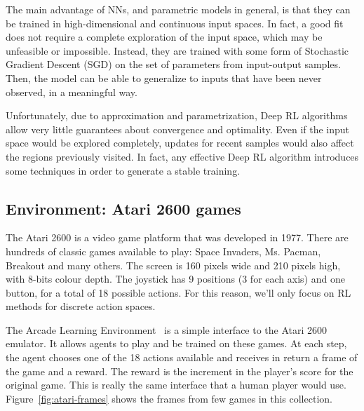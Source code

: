 The main advantage of NNs, and parametric models in general, is that they can
be trained in high-dimensional and continuous input spaces. In fact, a good
fit does not require a complete exploration of the input space, which may be
unfeasible or impossible. Instead, they are trained with some form of
Stochastic Gradient Descent (SGD) on the set of parameters from input-output
samples. Then, the model can be able to generalize to inputs that have been
never observed, in a meaningful way.

Unfortunately, due to approximation and parametrization, Deep RL algorithms
allow very little guarantees about convergence and optimality. Even if the
input space would be explored completely, updates for recent samples would
also affect the regions previously visited. In fact, any effective Deep RL
algorithm introduces some techniques in order to generate a stable training.


\subsection{Environment: Atari 2600 games}

The Atari 2600 is a video game platform that was developed in 1977. There are
hundreds of classic games available to play: Space Invaders, Ms. Pacman,
Breakout and many others. The screen is 160 pixels wide and 210 pixels high,
with 8-bits colour depth. The joystick has 9 positions (3 for each axis) and
one button, for a total of 18 possible actions. For this reason, we'll only
focus on RL methods for discrete action spaces.

The Arcade Learning Environment~\cite{bib:atari-games} is a simple interface
to the Atari 2600 emulator. It allows agents to play and be trained on these
games. At each step, the agent chooses one of the 18 actions available and
receives in return a frame of the game and a reward. The reward is the
increment in the player's score for the original game. This is really the same
interface that a human player would use. Figure~\ref{fig:atari-frames} shows
the frames from few games in this collection. 

